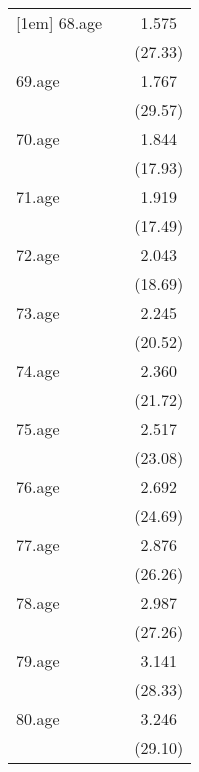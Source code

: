{\begin{tabular}{l*{2}{c}}
[1em]
68.age      &                     &       1.575\sym{***}\\
            &                     &     (27.33)         \\
[1em]
69.age      &                     &       1.767\sym{***}\\
            &                     &     (29.57)         \\
[1em]
70.age      &                     &       1.844\sym{***}\\
            &                     &     (17.93)         \\
[1em]
71.age      &                     &       1.919\sym{***}\\
            &                     &     (17.49)         \\
[1em]
72.age      &                     &       2.043\sym{***}\\
            &                     &     (18.69)         \\
[1em]
73.age      &                     &       2.245\sym{***}\\
            &                     &     (20.52)         \\
[1em]
74.age      &                     &       2.360\sym{***}\\
            &                     &     (21.72)         \\
[1em]
75.age      &                     &       2.517\sym{***}\\
            &                     &     (23.08)         \\
[1em]
76.age      &                     &       2.692\sym{***}\\
            &                     &     (24.69)         \\
[1em]
77.age      &                     &       2.876\sym{***}\\
            &                     &     (26.26)         \\
[1em]
78.age      &                     &       2.987\sym{***}\\
            &                     &     (27.26)         \\
[1em]
79.age      &                     &       3.141\sym{***}\\
            &                     &     (28.33)         \\
[1em]
80.age      &                     &       3.246\sym{***}\\
            &                     &     (29.10)         \\

\end{tabular}}
